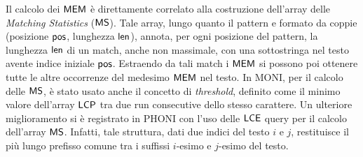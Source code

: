\documentclass[a4paper,11pt, oneside,italian]{article}
\def\LCE{\mbox{\rm {\sf LCE}}}
\def\len{\mbox{\rm {\sf len}}}
\def\pos{\mbox{\rm {\sf pos}}}
\def\LCP{\mbox{\rm {\sf LCP}}}
\def\MEM{\mbox{\rm {\sf MEM}}}
\def\MS{\mbox{\rm {\sf MS}}}
\def\LCP{\mbox{\rm {\sf LCP}}}
\def\LCE{\mbox{\rm {\sf LCE}}}
\begin{document}
Il calcolo dei $\MEM$ è direttamente
correlato alla costruzione dell'array delle \textit{Matching Statistics}
($\MS$). Tale array, lungo quanto il pattern e formato da coppie (posizione
$\pos$, lunghezza $\len$), annota, per ogni posizione del pattern, la lunghezza
$\len$ di un match, anche non massimale, con una sottostringa nel testo avente
indice iniziale $\pos$. Estraendo da tali match i $\MEM$ si possono poi ottenere
tutte le altre occorrenze del medesimo $\MEM$ nel testo. 
In MONI, per il calcolo delle $\MS$, è stato
usato anche il concetto di \textit{threshold}, definito come
il minimo valore dell'array $\LCP$ tra due run consecutive dello stesso
carattere. Un ulteriore miglioramento si è registrato in PHONI con
l'uso delle $\LCE$ query per il calcolo dell'array $\MS$. Infatti, tale
struttura, dati due indici del testo $i$ e $j$, restituisce il più lungo
prefisso comune tra i suffissi $i$-esimo e $j$-esimo del testo.


\end{document}
